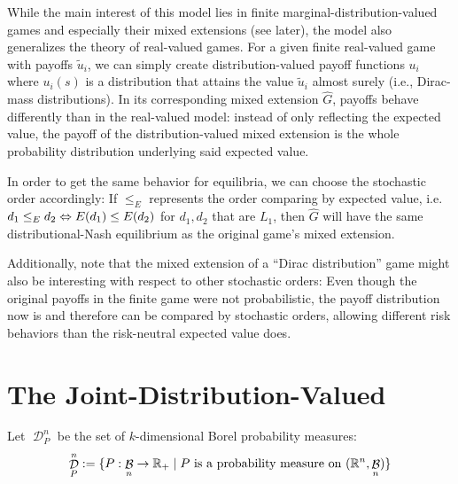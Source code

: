 \documentclass[a4paper]{scrreprt}
\DeclareMathOperator{\D}{\mathcal{D}}
\DeclareMathOperator{\B}{\mathcal{B}}
\begin{document}
    \begin{ex}
        While the main interest of this model lies in finite marginal-distribution-valued games and especially their mixed extensions (see later), the model also generalizes the theory of real-valued games. For a given finite real-valued game with payoffs $\tilde{u}_i$, we can simply create distribution-valued payoff functions $u_i$ where $u_i(s)$ is a distribution that attains the value $\tilde{u}_i$ almost surely (i.e., Dirac-mass distributions).
        In its corresponding mixed extension $\hat{G}$, payoffs behave differently than in the real-valued model: instead of only reflecting the expected value, the payoff of the distribution-valued mixed extension is the whole probability distribution underlying said expected value.
        
        In order to get the same behavior for equilibria, we can choose the stochastic order accordingly: If $\leq_E$ represents the order comparing by expected value, i.e. $d_1 \leq_E d_2 \Leftrightarrow E(d_1) \leq E(d_2)$ for $d_1, d_2$ that are $L_1$,
        then $\hat{G}$ will have the same distributional-Nash equilibrium as the original game's mixed extension.
        
        Additionally, note that the mixed extension of a “Dirac distribution” game might also be interesting with respect to other stochastic orders: Even though the original payoffs in the finite game were not probabilistic, the payoff distribution now is and therefore can be compared by stochastic orders, allowing different risk behaviors than the risk-neutral expected value does.
    \end{ex}

    
    \section{The Joint-Distribution-Valued}
    Let $\D_P^n$ be the set of $k$-dimensional Borel probability measures:    
    \[ \D_P^n := \set{P: \B_n \to \R_+ \mid P \text{ is a probability measure on } (\R^n, \B_n)} \]
    
\end{document}
